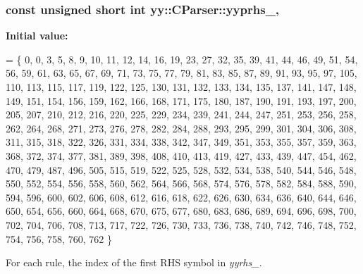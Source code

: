 \hypertarget{classyy_1_1CParser_a4770c24bafb8279c34b75af15b77d94f}{
\subsubsection[{yyprhs\-\_\-}]{\setlength{\rightskip}{0pt plus 5cm}const unsigned short int yy\-::\-C\-Parser\-::yyprhs\-\_\-\hspace{0.3cm}{\ttfamily [static]}, {\ttfamily [private]}}}\label{classyy_1_1CParser_a4770c24bafb8279c34b75af15b77d94f}
{\bfseries Initial value\-:}
\begin{DoxyCode}
=
  \{
         0,     0,     3,     5,     8,     9,    10,    11,    12,    14,
      16,    19,    23,    27,    32,    35,    39,    41,    44,    46,
      49,    51,    54,    56,    59,    61,    63,    65,    67,    69,
      71,    73,    75,    77,    79,    81,    83,    85,    87,    89,
      91,    93,    95,    97,   105,   110,   113,   115,   117,   119,
     122,   125,   130,   131,   132,   133,   134,   135,   137,   141,
     147,   148,   149,   151,   154,   156,   159,   162,   166,   168,
     171,   175,   180,   187,   190,   191,   193,   197,   200,   205,
     207,   210,   212,   216,   220,   225,   229,   234,   239,   241,
     244,   247,   251,   253,   256,   258,   262,   264,   268,   271,
     273,   276,   278,   282,   284,   288,   293,   295,   299,   301,
     304,   306,   308,   311,   315,   318,   322,   326,   331,   334,
     338,   342,   347,   349,   351,   353,   355,   357,   359,   363,
     368,   372,   374,   377,   381,   389,   398,   408,   410,   413,
     419,   427,   433,   439,   447,   454,   462,   470,   479,   487,
     496,   505,   515,   519,   522,   525,   528,   532,   534,   538,
     540,   544,   546,   548,   550,   552,   554,   556,   558,   560,
     562,   564,   566,   568,   574,   576,   578,   582,   584,   588,
     590,   594,   596,   600,   602,   606,   608,   612,   616,   618,
     622,   626,   630,   634,   636,   640,   644,   646,   650,   654,
     656,   660,   664,   668,   670,   675,   677,   680,   683,   686,
     689,   694,   696,   698,   700,   702,   704,   706,   708,   713,
     717,   722,   726,   730,   733,   736,   738,   740,   742,   746,
     748,   752,   754,   756,   758,   760,   762
  \}
\end{DoxyCode}


For each rule, the index of the first R\-H\-S symbol in {\itshape yyrhs\-\_\-}. 

